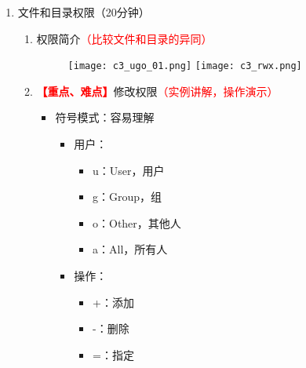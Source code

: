 \documentclass{TIJMUjiaoanLL}
\begin{document}
\begin{enumerate}
\begin{enumerate}
\begin{multicols}{2}
\begin{itemize}
	      \begin{itemize}
                \item 语法：ln -s source softlink
		\item 本质：保存原文件的路径
		\item inode：与原文件不同，是唯一的
		\item 类比：快捷方式
		\item 文件系统：能跨越
		\item 修改链接：原文件随之变化
		\item 删除链接：原文件不受影响
		\item 删除原文件：链接失效
		\item 使用对象：文件和目录
	      \end{itemize}
	  \end{itemize}
        \end{multicols}
        \vspace*{-10pt}
    \end{enumerate}

  \item 文件和目录权限（20分钟）
    \begin{enumerate}
      \item 权限简介\textcolor{red}{（比较文件和目录的异同）}
	\vspace*{-10pt}
	\begin{figure}[h]
	  \centering
          \texttt{[image: c3\_ugo\_01.png]}
	  \quad
          \texttt{[image: c3\_rwx.png]}
	\end{figure}
	\vspace*{-10pt}
      \item \textcolor{red}{\textbf{【重点、难点】}}修改权限\textcolor{red}{（实例讲解，操作演示）}
	\begin{itemize}
	  \item 符号模式：容易理解
            \vspace*{-10pt}
            \begin{multicols}{3}
	      \begin{itemize}
		\item 用户：
		  \begin{itemize}
		    \item u：User，用户
		    \item g：Group，组
		    \item o：Other，其他人
		    \item a：All，所有人
		  \end{itemize}
		\item 操作：
		  \begin{itemize}
		    \item +：添加
		    \item -：删除
		    \item =：指定


\end{itemize}
\end{itemize}
\end{multicols}
\end{itemize}
\end{enumerate}
\end{enumerate}
\end{document}
